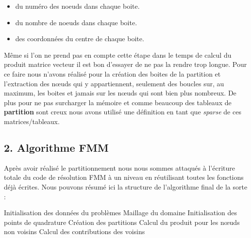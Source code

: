 \documentclass[10pt]{article}
\begin{document}
\begin{multicols}{2}
\begin{itemize}
\item du numéro des noeuds dans chaque boite. 
\item du nombre de noeuds dans chaque boite.
\item des coordonnées du centre de chaque boite. 
\end{itemize}



Même si l'on ne prend pas en compte cette étape dans le temps de calcul du produit matrice vecteur il est bon d'essayer de ne pas la rendre trop longue. Pour ce faire nous n'avons réalisé pour la création des boites de la partition et l'extraction des nœuds qui y appartiennent, seulement des boucles sur, au maximum, les boites et jamais sur les nœuds qui sont bien plus nombreux. De plus pour ne pas surcharger la mémoire et comme beaucoup des tableaux de \textbf{partition} sont creux nous avons utilisé une définition en tant que \textit{sparse} de ces matrices/tableaux. \\




\vspace*{22pt}



\subsection*{2. Algorithme FMM}

Après avoir réalisé le partitionnement nous nous sommes attaqués à l'écriture totale du code de résolution FMM à un niveau en réutilisant toutes les fonctions déjà écrites. Nous pouvons résumé ici la structure de l'algorithme final de la sorte : 

\begin{algorithm}[H]
	\begin{algorithmic}[1]
		\State Initialisation des données du problèmes
        \State Maillage du domaine
        \State Initialisation des points de quadrature
        \State Création des partitions
        \State Calcul du produit pour les nœuds non voisins
        \State Calcul des contributions des voisins
	\end{algorithmic}
\end{algorithm}
    




\end{multicols}
\end{document}
